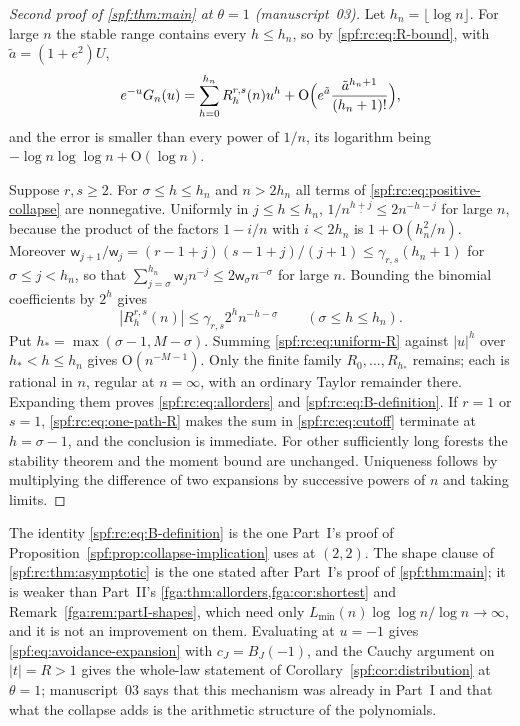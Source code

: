 \documentclass[11pt]{article}
\numberwithin{equation}{section}
\theoremstyle{definition}
\theoremstyle{remark}
\theoremstyle{definition}
\newcommand{\fall}[2]{{#1}^{\underline{#2}}}
\newcommand{\bigO}{\mathrm O}
\newcommand{\rcw}{\mathsf w}
\begin{document}
\begin{proof}[Second proof of \cref{spf:thm:main} at $\theta=1$ (manuscript~03)]
Let $h_n=\lfloor\log n\rfloor$. For large $n$ the stable range contains
every $h\le h_n$, so by \eqref{spf:rc:eq:R-bound}, with $\tilde a=(1+e^2)U$,
\begin{equation}
 e^{-u}G_n(u)=\sum_{h=0}^{h_n}R_h^{r,s}(n)u^h
        +\bigO\Bigl(e^{\tilde a}\frac{\tilde a^{h_n+1}}{(h_n+1)!}\Bigr),
 \label{spf:rc:eq:cutoff}
\end{equation}
and the error is smaller than every power of $1/n$, its logarithm being
$-\log n\log\log n+\bigO(\log n)$.

Suppose $r,s\ge2$. For $\sigma\le h\le h_n$ and $n>2h_n$ all terms of
\eqref{spf:rc:eq:positive-collapse} are nonnegative. Uniformly in
$j\le h\le h_n$, $1/\fall n{h+j}\le2n^{-h-j}$ for large $n$, because the
product of the factors $1-i/n$ with $i<2h_n$ is $1+\bigO(h_n^2/n)$.
Moreover $\rcw_{j+1}/\rcw_j=(r-1+j)(s-1+j)/(j+1)\le\gamma_{r,s}(h_n+1)$
for $\sigma\le j<h_n$, so that
$\sum_{j=\sigma}^{h_n}\rcw_jn^{-j}\le2\rcw_\sigma n^{-\sigma}$ for large $n$.
Bounding the binomial coefficients by $2^h$ gives
\begin{equation}
 |R_h^{r,s}(n)|\le\gamma_{r,s}2^hn^{-h-\sigma}\qquad(\sigma\le h\le h_n).
 \label{spf:rc:eq:uniform-R}
\end{equation}
Put $h_*=\max(\sigma-1,M-\sigma)$. Summing \eqref{spf:rc:eq:uniform-R}
against $|u|^h$ over $h_*<h\le h_n$ gives $\bigO(n^{-M-1})$. Only the finite
family $R_0,\ldots,R_{h_*}$ remains; each is rational in $n$, regular at
$n=\infty$, with an ordinary Taylor remainder there. Expanding them proves
\eqref{spf:rc:eq:allorders} and \eqref{spf:rc:eq:B-definition}. If $r=1$ or
$s=1$, \eqref{spf:rc:eq:one-path-R} makes the sum in \eqref{spf:rc:eq:cutoff}
terminate at $h=\sigma-1$, and the conclusion is immediate. For other
sufficiently long forests the stability theorem and the moment bound are
unchanged. Uniqueness follows by multiplying the difference of two
expansions by successive powers of $n$ and taking limits.
\end{proof}

The identity \eqref{spf:rc:eq:B-definition} is the one Part~I's proof of
Proposition~\ref{spf:prop:collapse-implication} uses at $(2,2)$. The shape
clause of \cref{spf:rc:thm:asymptotic} is the one stated after Part~I's proof
of \cref{spf:thm:main}; it is weaker than Part~II's
\cref{fga:thm:allorders,fga:cor:shortest} and Remark~\ref{fga:rem:partI-shapes},
which need only $L_{\min}(n)\log\log n/\log n\to\infty$, and it is not an
improvement on them. Evaluating at $u=-1$ gives
\eqref{spf:eq:avoidance-expansion} with $c_J=B_J(-1)$, and the Cauchy
argument on $|t|=R>1$ gives the whole-law statement of
Corollary~\ref{spf:cor:distribution} at $\theta=1$; manuscript~03 says that
this mechanism was already in Part~I and that what the collapse adds is the
arithmetic structure of the polynomials.
\end{document}
